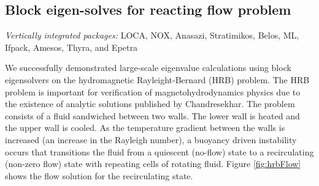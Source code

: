 \documentclass[pdf,ps2pdf,11pt]{SANDreport}
\begin{document}



%
\subsection{Block eigen-solves for reacting flow problem}
%

{}\noindent\textit{Vertically integrated packages:} LOCA, NOX, Anasazi,
Stratimikos, Belos, ML, Ifpack, Amesos, Thyra, and Epetra

We successfully demonstrated large-scale eigenvalue calculations using block
eigensolvers on the hydromagnetic Rayleight-Bernard (HRB) problem.  The HRB
problem is important for verification of magnetohydrodynamics physics due to
the existence of analytic solutions published by Chandresekhar.  The problem
consists of a fluid sandwiched between two walls.  The lower wall is heated
and the upper wall is cooled.  As the temperature gradient between the walls
is increased (an increase in the Rayleigh number), a buoyancy driven
instability occurs that transitions the fluid from a quiescent (no-flow) state
to a recirculating (non-zero flow) state with repeating cells of rotating
fluid.  Figure \ref{fig:hrbFlow} shows the flow solution for the recirculating
state.
\end{document}
